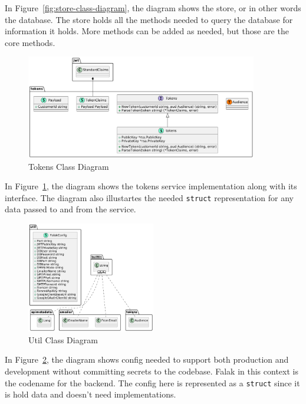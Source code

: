 In Figure~\ref{fig:store-class-diagram}, the diagram shows the store, or in other words the database. The store holds all the methods needed to query the database for information it holds. More methods can be added as needed, but those are the core methods.



\begin{figure}[!h]
    \centering
    \includegraphics[width=0.9\textwidth]{images/docs/diagrams/class/class-diagram/tokens.png}
    \caption{Tokens Class Diagram}
    \label{fig:tokens-class-diagram}
\end{figure}

In Figure~\ref{fig:tokens-class-diagram}, the diagram shows the tokens service implementation along with its interface. The diagram also illustartes the needed \texttt{struct} representation for any data passed to and from the service.



\begin{figure}[!h]
    \centering
    \includegraphics[width=0.5\textwidth]{images/docs/diagrams/class/class-diagram/util.png}
    \caption{Util Class Diagram}
    \label{fig:util-class-diagram}
\end{figure}

In Figure~\ref{fig:util-class-diagram}, the diagram shows config needed to support both production and development without committing secrets to the codebase. Falak in this context is the codename for the backend. The config here is represented as a \texttt{struct} since it is hold data and doesn't need implementations.